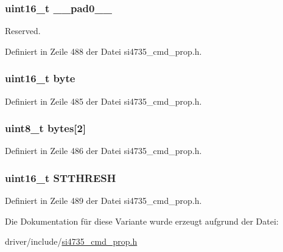 \subsubsection[{\+\_\+\+\_\+pad0\+\_\+\+\_\+}]{\setlength{\rightskip}{0pt plus 5cm}uint16\+\_\+t \+\_\+\+\_\+pad0\+\_\+\+\_\+}\label{unionfm__blend__stereo_a77132c2c26a75f5b8751b235cda23828}


Reserved. 



Definiert in Zeile 488 der Datei si4735\+\_\+cmd\+\_\+prop.\+h.

\hypertarget{unionfm__blend__stereo_ab0549c1b5ea980a02e7eab77e21fea49}{}
\subsubsection[{byte}]{\setlength{\rightskip}{0pt plus 5cm}uint16\+\_\+t byte}\label{unionfm__blend__stereo_ab0549c1b5ea980a02e7eab77e21fea49}


Definiert in Zeile 485 der Datei si4735\+\_\+cmd\+\_\+prop.\+h.

\hypertarget{unionfm__blend__stereo_a46e4c05d20a047ec169f60d3167e912e}{}
\subsubsection[{bytes}]{\setlength{\rightskip}{0pt plus 5cm}uint8\+\_\+t bytes\mbox{[}2\mbox{]}}\label{unionfm__blend__stereo_a46e4c05d20a047ec169f60d3167e912e}


Definiert in Zeile 486 der Datei si4735\+\_\+cmd\+\_\+prop.\+h.

\hypertarget{unionfm__blend__stereo_a657a0ae89d4ea37bac29c56d527e1454}{}
\subsubsection[{S\+T\+T\+H\+R\+E\+S\+H}]{\setlength{\rightskip}{0pt plus 5cm}uint16\+\_\+t S\+T\+T\+H\+R\+E\+S\+H}\label{unionfm__blend__stereo_a657a0ae89d4ea37bac29c56d527e1454}


Definiert in Zeile 489 der Datei si4735\+\_\+cmd\+\_\+prop.\+h.



Die Dokumentation für diese Variante wurde erzeugt aufgrund der Datei\+:\begin{DoxyCompactItemize}
\item 
driver/include/\hyperlink{si4735__cmd__prop_8h}{si4735\+\_\+cmd\+\_\+prop.\+h}\end{DoxyCompactItemize}
